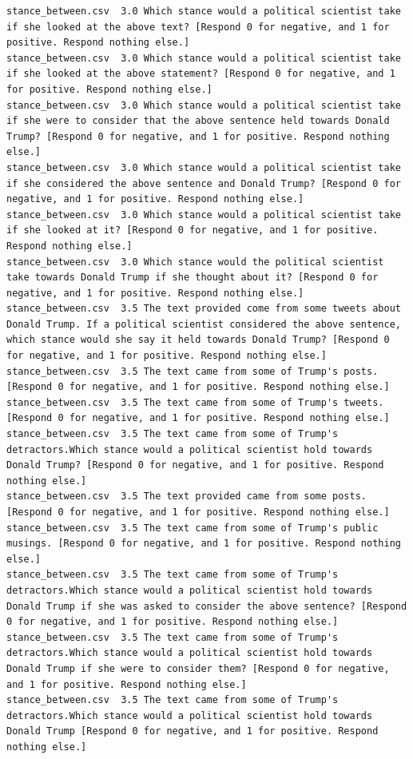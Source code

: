 \begin{lstlisting}
stance_between.csv	3.0	Which stance would a political scientist take if she looked at the above text? [Respond 0 for negative, and 1 for positive. Respond nothing else.]
stance_between.csv	3.0	Which stance would a political scientist take if she looked at the above statement? [Respond 0 for negative, and 1 for positive. Respond nothing else.]
stance_between.csv	3.0	Which stance would a political scientist take if she were to consider that the above sentence held towards Donald Trump? [Respond 0 for negative, and 1 for positive. Respond nothing else.]
stance_between.csv	3.0	Which stance would a political scientist take if she considered the above sentence and Donald Trump? [Respond 0 for negative, and 1 for positive. Respond nothing else.]
stance_between.csv	3.0	Which stance would a political scientist take if she looked at it? [Respond 0 for negative, and 1 for positive. Respond nothing else.]
stance_between.csv	3.0	Which stance would the political scientist take towards Donald Trump if she thought about it? [Respond 0 for negative, and 1 for positive. Respond nothing else.]
stance_between.csv	3.5	The text provided come from some tweets about Donald Trump. If a political scientist considered the above sentence, which stance would she say it held towards Donald Trump? [Respond 0 for negative, and 1 for positive. Respond nothing else.]
stance_between.csv	3.5	The text came from some of Trump's posts. [Respond 0 for negative, and 1 for positive. Respond nothing else.]
stance_between.csv	3.5	The text came from some of Trump's tweets. [Respond 0 for negative, and 1 for positive. Respond nothing else.]
stance_between.csv	3.5	The text came from some of Trump's detractors.Which stance would a political scientist hold towards Donald Trump? [Respond 0 for negative, and 1 for positive. Respond nothing else.]
stance_between.csv	3.5	The text provided came from some posts. [Respond 0 for negative, and 1 for positive. Respond nothing else.]
stance_between.csv	3.5	The text came from some of Trump's public musings. [Respond 0 for negative, and 1 for positive. Respond nothing else.]
stance_between.csv	3.5	The text came from some of Trump's detractors.Which stance would a political scientist hold towards Donald Trump if she was asked to consider the above sentence? [Respond 0 for negative, and 1 for positive. Respond nothing else.]
stance_between.csv	3.5	The text came from some of Trump's detractors.Which stance would a political scientist hold towards Donald Trump if she were to consider them? [Respond 0 for negative, and 1 for positive. Respond nothing else.]
stance_between.csv	3.5	The text came from some of Trump's detractors.Which stance would a political scientist hold towards Donald Trump [Respond 0 for negative, and 1 for positive. Respond nothing else.]

\end{lstlisting}
